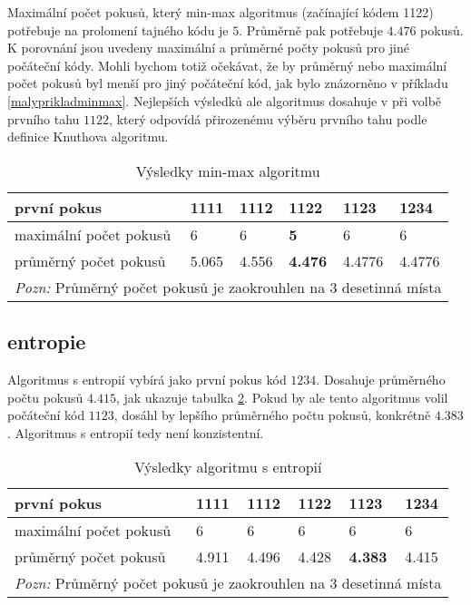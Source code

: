Maximální počet pokusů, který min-max algoritmus (začínající kódem 1122) potřebuje na prolomení tajného kódu je $5$. Průměrně pak potřebuje $4.476$ pokusů. K porovnání jsou uvedeny maximální a průměrné počty pokusů pro jiné počáteční kódy. Mohli bychom totiž očekávat, že by průměrný nebo maximální počet pokusů byl menší pro jiný počáteční kód, jak bylo znázorněno v příkladu \ref{malyprikladminmax}. Nejlepších výsledků ale algoritmus dosahuje v při volbě prvního tahu $1122$, který odpovídá přirozenému výběru prvního tahu podle definice Knuthova algoritmu. 

\begin{table}[h]
\centering
\begin{tabular}{l l l l l l}
\toprule
první pokus & 1111 & 1112 & \textbf{1122} & 1123 & 1234 \\
\midrule

maximální počet pokusů 
& 6 & 6 & \textbf{5} & 6 & 6 \\

průměrný počet pokusů 
& 5.065 & 4.556 & \textbf{4.476} & 4.4776 & 4.4776\\
\bottomrule
\multicolumn{6}{l}{\footnotesize \textit{Pozn:}
Průměrný počet pokusů je zaokrouhlen na $3$ desetinná místa}
\end{tabular}
\caption{Výsledky min-max algoritmu}\label{tabminmaxvysl}
\end{table}

\subsection{entropie}

Algoritmus s entropií vybírá jako první pokus kód $1234$. Dosahuje průměrného počtu pokusů $4.415$, jak ukazuje tabulka \ref{tabentropievysl}. Pokud by ale tento algoritmus volil počáteční kód $1123$, dosáhl by lepšího průměrného počtu pokusů, konkrétně $4.383$. Algoritmus s entropií tedy není konzistentní. 

\begin{table}[h]
\centering
\begin{tabular}{l l l l l l}
\toprule
první pokus & 1111 & 1112 & 1122 & 1123 & \textbf{1234} \\
\midrule

maximální počet pokusů 
& 6 & 6 & 6 & 6 & 6 \\

průměrný počet pokusů 
& 4.911 & 4.496 & 4.428 & \textbf{4.383} & 4.415 \\
\bottomrule
\multicolumn{6}{l}{\footnotesize \textit{Pozn:}
Průměrný počet pokusů je zaokrouhlen na $3$ desetinná místa}
\end{tabular}
\caption{Výsledky algoritmu s entropií}\label{tabentropievysl}
\end{table}



